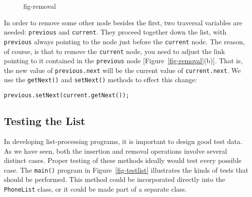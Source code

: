 
\begin{figure}[tb]
 {fig-removal}
\end{figure}

\noindent In order to remove some other node besides the first, two traversal
variables are needed: {\tt previous} and {\tt current}.  They
proceed together down the list, with {\tt previous} always pointing to
the node just before the {\tt current} node.  The reason, of course, is
that to remove the {\tt current} node, you need to adjust the link
pointing to it contained in the \mbox{\tt previous} node
[Figure~\ref{fig-removal}(b)].  That is, the new value of
{\tt previous.next} will be the current value of {\tt current.next}.
We use the {\tt getNext()} and \mbox{\tt setNext()} methods to
effect this change:

\begin{jjjlisting}
\begin{lstlisting}
previous.setNext(current.getNext());
\end{lstlisting}
\end{jjjlisting}

\pagebreak
\subsection*{Testing the List}

\noindent In developing list-processing programs, it is important to
design good test data.  As we have seen, both the insertion and
removal operations involve several distinct cases.  Proper testing of
these methods ideally would test every possible case.  
The {\tt main()} program in Figure~\ref{fig-testlist} illustrates the
kinds of tests that should be performed.  This method could be
incorporated directly into the {\tt PhoneList} class, or it could be
made part of a separate class.


